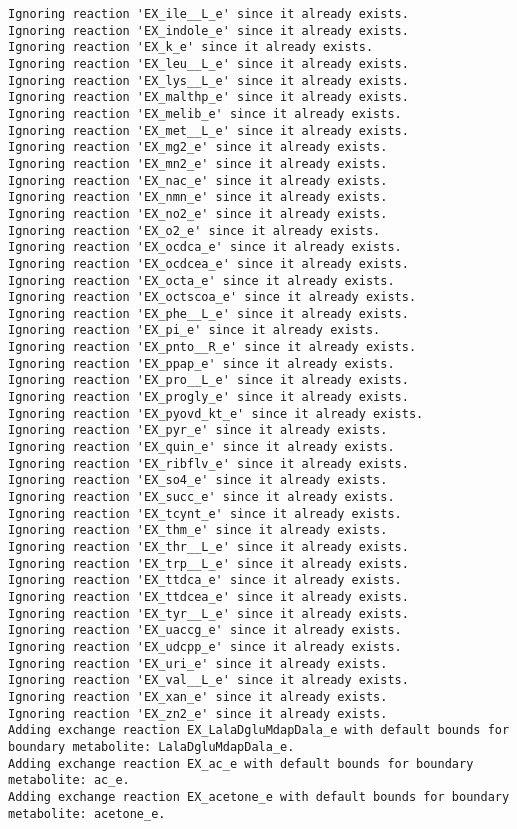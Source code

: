\documentclass[
  letterpaper,
  DIV=11,
  numbers=noendperiod]{scrartcl}
\begin{document}
\begin{verbatim}
Ignoring reaction 'EX_ile__L_e' since it already exists.
Ignoring reaction 'EX_indole_e' since it already exists.
Ignoring reaction 'EX_k_e' since it already exists.
Ignoring reaction 'EX_leu__L_e' since it already exists.
Ignoring reaction 'EX_lys__L_e' since it already exists.
Ignoring reaction 'EX_malthp_e' since it already exists.
Ignoring reaction 'EX_melib_e' since it already exists.
Ignoring reaction 'EX_met__L_e' since it already exists.
Ignoring reaction 'EX_mg2_e' since it already exists.
Ignoring reaction 'EX_mn2_e' since it already exists.
Ignoring reaction 'EX_nac_e' since it already exists.
Ignoring reaction 'EX_nmn_e' since it already exists.
Ignoring reaction 'EX_no2_e' since it already exists.
Ignoring reaction 'EX_o2_e' since it already exists.
Ignoring reaction 'EX_ocdca_e' since it already exists.
Ignoring reaction 'EX_ocdcea_e' since it already exists.
Ignoring reaction 'EX_octa_e' since it already exists.
Ignoring reaction 'EX_octscoa_e' since it already exists.
Ignoring reaction 'EX_phe__L_e' since it already exists.
Ignoring reaction 'EX_pi_e' since it already exists.
Ignoring reaction 'EX_pnto__R_e' since it already exists.
Ignoring reaction 'EX_ppap_e' since it already exists.
Ignoring reaction 'EX_pro__L_e' since it already exists.
Ignoring reaction 'EX_progly_e' since it already exists.
Ignoring reaction 'EX_pyovd_kt_e' since it already exists.
Ignoring reaction 'EX_pyr_e' since it already exists.
Ignoring reaction 'EX_quin_e' since it already exists.
Ignoring reaction 'EX_ribflv_e' since it already exists.
Ignoring reaction 'EX_so4_e' since it already exists.
Ignoring reaction 'EX_succ_e' since it already exists.
Ignoring reaction 'EX_tcynt_e' since it already exists.
Ignoring reaction 'EX_thm_e' since it already exists.
Ignoring reaction 'EX_thr__L_e' since it already exists.
Ignoring reaction 'EX_trp__L_e' since it already exists.
Ignoring reaction 'EX_ttdca_e' since it already exists.
Ignoring reaction 'EX_ttdcea_e' since it already exists.
Ignoring reaction 'EX_tyr__L_e' since it already exists.
Ignoring reaction 'EX_uaccg_e' since it already exists.
Ignoring reaction 'EX_udcpp_e' since it already exists.
Ignoring reaction 'EX_uri_e' since it already exists.
Ignoring reaction 'EX_val__L_e' since it already exists.
Ignoring reaction 'EX_xan_e' since it already exists.
Ignoring reaction 'EX_zn2_e' since it already exists.
Adding exchange reaction EX_LalaDgluMdapDala_e with default bounds for boundary metabolite: LalaDgluMdapDala_e.
Adding exchange reaction EX_ac_e with default bounds for boundary metabolite: ac_e.
Adding exchange reaction EX_acetone_e with default bounds for boundary metabolite: acetone_e.

\end{verbatim}
\end{document}
